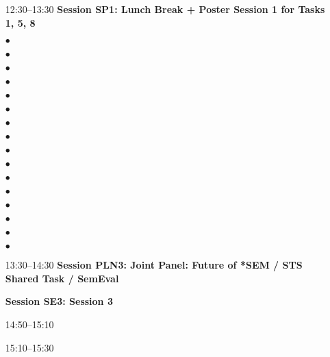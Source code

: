 \begin{itemize}
\vspace{1ex}
\item[12:30--13:30] {\bfseries  Session SP1: Lunch Break + Poster Session 1 for Tasks 1, 5, 8}
\item[$\bullet$] 
\item[$\bullet$] 
\item[$\bullet$] 
\item[$\bullet$] 
\item[$\bullet$] 
\item[$\bullet$] 
\item[$\bullet$] 
\item[$\bullet$] 
\item[$\bullet$] 
\item[$\bullet$] 
\item[$\bullet$] 
\item[$\bullet$] 
\item[$\bullet$] 
\item[$\bullet$] 
\item[$\bullet$] 
\item[$\bullet$] 

\vspace{1ex}
\item[13:30--14:30] {\bfseries  Session PLN3: Joint Panel: Future of *SEM / STS Shared Task / SemEval}

\vspace{1ex}
\item[] {\bfseries Session SE3: Session 3}
\item[14:50--15:10] 
\item[15:10--15:30] 


\end{itemize}
